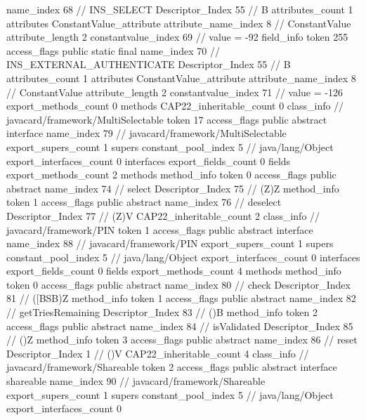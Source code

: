{{{{{				name_index	68		// INS_SELECT
				Descriptor_Index	55		// B
				attributes_count	1
				attributes {
				ConstantValue_attribute {
					attribute_name_index	8		// ConstantValue
					attribute_length	2
					constantvalue_index	69		// value = -92
				}
				}
			}
			field_info {
				token	255
				access_flags	public static final
				name_index	70		// INS_EXTERNAL_AUTHENTICATE
				Descriptor_Index	55		// B
				attributes_count	1
				attributes {
				ConstantValue_attribute {
					attribute_name_index	8		// ConstantValue
					attribute_length	2
					constantvalue_index	71		// value = -126
				}
				}
			}
			}
			export_methods_count	0
			methods {
			}
			CAP22_inheritable_count	0
		}
		class_info {		// javacard/framework/MultiSelectable
			token	17
			access_flags	public abstract interface
			name_index	79		// javacard/framework/MultiSelectable
			export_supers_count	1
			supers {
				constant_pool_index	5		// java/lang/Object
			}
			export_interfaces_count	0
			interfaces {
			}
			export_fields_count	0
			fields {
			}
			export_methods_count	2
			methods {
				method_info {
					token	0
					access_flags	public abstract
					name_index	74		// select
					Descriptor_Index	75		// (Z)Z
				}
				method_info {
					token	1
					access_flags	public abstract
					name_index	76		// deselect
					Descriptor_Index	77		// (Z)V
				}
			}
			CAP22_inheritable_count	2
		}
		class_info {		// javacard/framework/PIN
			token	1
			access_flags	public abstract interface
			name_index	88		// javacard/framework/PIN
			export_supers_count	1
			supers {
				constant_pool_index	5		// java/lang/Object
			}
			export_interfaces_count	0
			interfaces {
			}
			export_fields_count	0
			fields {
			}
			export_methods_count	4
			methods {
				method_info {
					token	0
					access_flags	public abstract
					name_index	80		// check
					Descriptor_Index	81		// ([BSB)Z
				}
				method_info {
					token	1
					access_flags	public abstract
					name_index	82		// getTriesRemaining
					Descriptor_Index	83		// ()B
				}
				method_info {
					token	2
					access_flags	public abstract
					name_index	84		// isValidated
					Descriptor_Index	85		// ()Z
				}
				method_info {
					token	3
					access_flags	public abstract
					name_index	86		// reset
					Descriptor_Index	1		// ()V
				}
			}
			CAP22_inheritable_count	4
		}
		class_info {		// javacard/framework/Shareable
			token	2
			access_flags	public abstract interface shareable
			name_index	90		// javacard/framework/Shareable
			export_supers_count	1
			supers {
				constant_pool_index	5		// java/lang/Object
			}
			export_interfaces_count	0
}}}
